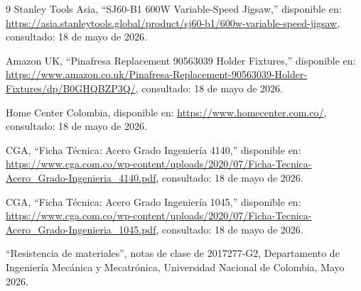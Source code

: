 \documentclass[12pt,letterpaper]{article}
\begin{document}

\begin{thebibliography}{9}
 Stanley Tools Asia, ``SJ60-B1 600W Variable-Speed Jigsaw,'' disponible en: \url{https://asia.stanleytools.global/product/sj60-b1/600w-variable-speed-jigsaw}, consultado: 18 de mayo de 2026.

 Amazon UK, ``Pinafresa Replacement 90563039 Holder Fixtures,'' disponible en: \url{https://www.amazon.co.uk/Pinafresa-Replacement-90563039-Holder-Fixtures/dp/B0GHQBZP3Q/}, consultado: 18 de mayo de 2026.

 Home Center Colombia, disponible en: \url{https://www.homecenter.com.co/}, consultado: 18 de mayo de 2026.

 CGA, ``Ficha Técnica: Acero Grado Ingeniería 4140,'' disponible en: \url{https://www.cga.com.co/wp-content/uploads/2020/07/Ficha-Tecnica-Acero_Grado-Ingenieria_4140.pdf}, consultado: 18 de mayo de 2026.

 CGA, ``Ficha Técnica: Acero Grado Ingeniería 1045,'' disponible en: \url{https://www.cga.com.co/wp-content/uploads/2020/07/Ficha-Tecnica-Acero_Grado-Ingenieria_1045.pdf}, consultado: 18 de mayo de 2026.

 ``Resistencia de materiales'', notas de clase de 2017277-G2, Departamento de Ingeniería Mecánica y Mecatrónica, Universidad Nacional de Colombia, Mayo 2026.

\end{thebibliography}
\end{document}

